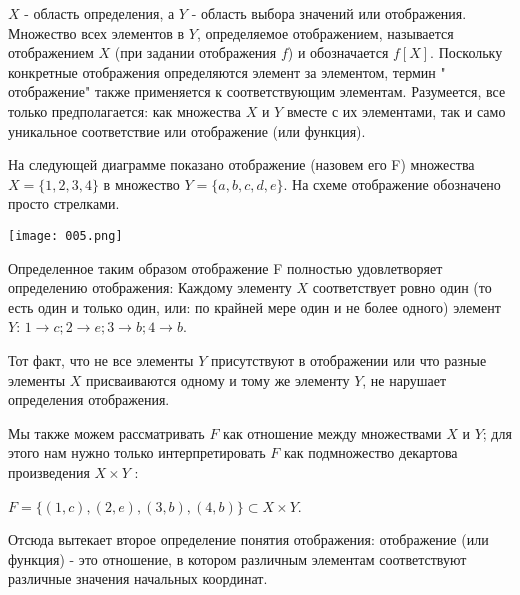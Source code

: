 \(X\) - область определения, а \(Y\) - область выбора значений или отображения. Множество всех элементов в \(Y\), определяемое отображением, называется отображением \(X\) (при задании отображения \(f\)) и обозначается \(f[X]\).
Поскольку конкретные отображения определяются элемент за элементом, термин " отображение" также применяется к соответствующим элементам. Разумеется, все только предполагается: как множества \(X\) и \(Y\) вместе с их элементами, так и само уникальное соответствие или отображение (или функция).

На следующей диаграмме показано отображение (назовем его F) множества \(X=\{1,2,3,4\}\) в множество \(Y=\{a,b,c,d,e\}\). На схеме отображение обозначено просто стрелками.
\begin{center}
  \texttt{[image: 005.png]}
\end{center}

Определенное таким образом отображение F полностью удовлетворяет определению отображения:  Каждому элементу \(X\) соответствует ровно один (то есть один и только один, или: по крайней мере один и не более одного) элемент \(Y\): \(1 \rightarrow c ; 2 \rightarrow e ; 3 \rightarrow b ; 4 \rightarrow b\).

Тот факт, что не все элементы \(Y\) присутствуют в отображении или что разные элементы \(X\) присваиваются одному и тому же элементу \(Y\), не нарушает определения отображения.

Мы также можем рассматривать \(F\) как отношение между множествами \(X\) и \(Y\); для этого нам нужно только интерпретировать \(F\) как подмножество декартова произведения \(X \times Y\) :

\vspace{0.5cm}
\(F=\{(1,c),(2,e),(3,b),(4,b)\} \subset X \times Y\).

\vspace{0.5cm}

Отсюда вытекает второе определение понятия отображения: отображение (или функция) - это отношение, в котором различным элементам соответствуют различные значения начальных координат.
